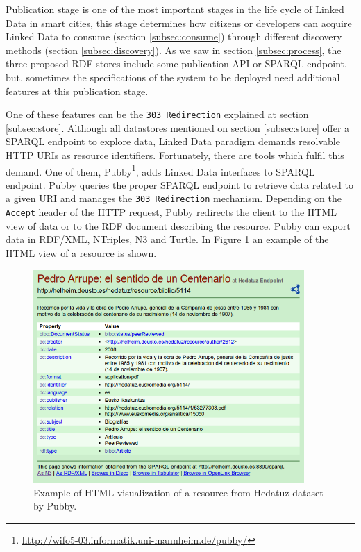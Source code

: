 Publication stage is one of the most important stages in the life cycle of Linked Data in smart cities, this stage determines how citizens or developers can acquire Linked Data to consume (section \ref{subsec:consume}) through different discovery methods (section \ref{subsec:discovery}). As we saw in section \ref{subsec:process}, the three proposed RDF stores include some publication API or SPARQL endpoint, but, sometimes the specifications of the system to be deployed need additional features at this publication stage.

One of these features can be the \texttt{303 Redirection} explained at section \ref{subsec:store}. Although all datastores mentioned on section \ref{subsec:store} offer a SPARQL endpoint to explore data, Linked Data paradigm demands resolvable HTTP URIs as resource identifiers. Fortunately, there are tools which fulfil this demand. One of them, Pubby\footnote{\url{http://wifo5-03.informatik.uni-mannheim.de/pubby/}}, adds Linked Data interfaces to SPARQL endpoint. Pubby queries the proper SPARQL endpoint to retrieve data related to a given URI and manages the \texttt{303 Redirection} mechanism. Depending on the \texttt{Accept} header of the HTTP request, Pubby redirects the client to the HTML view of data or to the RDF document describing the resource. Pubby can export data in RDF/XML, NTriples, N3 and Turtle. In Figure \ref{fig:pubby} an example of the HTML view of a resource is shown.

\begin{figure}
    \center
    \includegraphics[width=0.92\textwidth]{img/ld_approach/pubby.png}
    \caption{Example of HTML visualization of a resource from Hedatuz dataset by Pubby.}
    \label{fig:pubby}
\end{figure}

